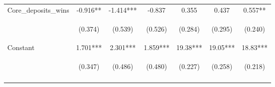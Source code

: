 \documentclass[]{article}
\begin{document}
\begin{center}
\begin{tabular}{lcccccc}
Core\_deposits\_wins & -0.916** & -1.414*** & -0.837 & 0.355 & 0.437 & 0.557** \\
\vspace{4pt} & \begin{footnotesize}(0.374)\end{footnotesize} & \begin{footnotesize}(0.539)\end{footnotesize} & \begin{footnotesize}(0.526)\end{footnotesize} & \begin{footnotesize}(0.284)\end{footnotesize} & \begin{footnotesize}(0.295)\end{footnotesize} & \begin{footnotesize}(0.240)\end{footnotesize} \\
Constant & 1.701*** & 2.301*** & 1.859*** & 19.38*** & 19.05*** & 18.83*** \\
 & \begin{footnotesize}(0.347)\end{footnotesize} & \begin{footnotesize}(0.486)\end{footnotesize} & \begin{footnotesize}(0.480)\end{footnotesize} & \begin{footnotesize}(0.227)\end{footnotesize} & \begin{footnotesize}(0.258)\end{footnotesize} & \begin{footnotesize}(0.218)\end{footnotesize} \\
\vspace{4pt} & \begin{footnotesize}\end{footnotesize} & \begin{footnotesize}\end{footnotesize} & \begin{footnotesize}\end{footnotesize} & \begin{footnotesize}\end{footnotesize} & \begin{footnotesize}\end{footnotesize} & \begin{footnotesize}\end{footnotesize} \\

\end{tabular}
\end{center}
\end{document}
